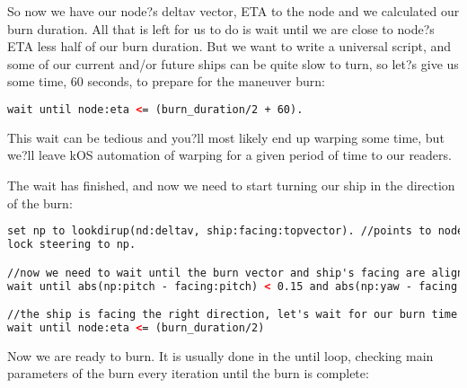 So now we have our node?s deltav vector, ETA to the node and we calculated our burn duration. All that is left for us to do is wait until we are close to node?s ETA less half of our burn duration. But we want to write a universal script, and some of our current and/or future ships can be quite slow to turn, so let?s give us some time, 60 seconds, to prepare for the maneuver burn:

\begin{lstlisting}[frame=single,language=XML]
wait until node:eta <= (burn_duration/2 + 60).
\end{lstlisting} 

This wait can be tedious and you?ll most likely end up warping some time, but we?ll leave kOS automation of warping for a given period of time to our readers.

The wait has finished, and now we need to start turning our ship in the direction of the burn:

\begin{lstlisting}[frame=single,language=XML]
set np to lookdirup(nd:deltav, ship:facing:topvector). //points to node, keeping roll the same.
lock steering to np.

//now we need to wait until the burn vector and ship's facing are aligned
wait until abs(np:pitch - facing:pitch) < 0.15 and abs(np:yaw - facing:yaw) < 0.15.

//the ship is facing the right direction, let's wait for our burn time
wait until node:eta <= (burn_duration/2)
\end{lstlisting} 

Now we are ready to burn. It is usually done in the until loop, checking main parameters of the burn every iteration until the burn is complete:

